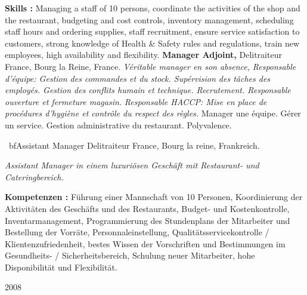 \begin{CV}[2]{-4.5ex}
{      {\bf Skills :} Managing a staff of 10 persons, coordinate the activities of the shop and the restaurant, budgeting and cost controls, inventory management, scheduling staff hours and ordering supplies, staff recruitment, ensure service satisfaction to customers, strong knowledge of Health \& Safety rules and regulations, train new employees, high availability and flexibility.
  }{%
    {\bf Manager Adjoint,}
    Delitraiteur France, Bourg la Reine, France.
    {\it Véritable manager en son absence,}
    {\it Responsable d'équipe: Gestion des commandes et du stock. Supérvision des tâches des employés. Gestion des conflits humain et technique. Recrutement. Responsable ouverture et fermeture magasin.}
    {\it Responsable HACCP: Mise en place de procédures d'hygiène et contrôle du respect des règles.}
    Manager une équipe. Gérer un service. Gestion administrative du restaurant. Polyvalence.
  }{%
    {\ bfAssistant  Manager}
    Delitraiteur France, Bourg la reine, Frankreich.
 
    {\it Assistant Manager in einem luxuriösen Geschäft mit Restaurant- und Cateringbereich.}
 
    {\bf Kompetenzen :} Führung einer Mannschaft von 10 Personen, Koordinierung der Aktivitäten des Geschäfts und des Restaurants, Budget-  und Kostenkontrolle, Inventarmanagement, Programmierung des Stundenplans der Mitarbeiter und Bestellung der  Vorräte, Personnaleinstellung, Qualitätsservicekontrolle /  Klientenzufriedenheit, bestes Wissen der Vorschriften und Bestimmungen im  Gesundheits- / Sicherheitsbereich, Schulung neuer Mitarbeiter, hohe  Disponibilität und Flexibilität.
  }

\item[2008]
\end{CV}
